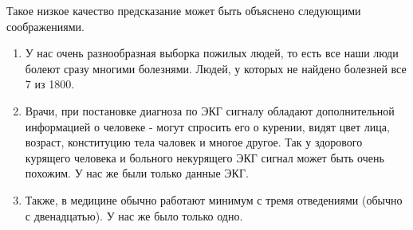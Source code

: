 Такое низкое качество предсказание может быть объяснено следующими соображениями.
\begin{enumerate}
	\item У нас очень разнообразная выборка пожилых людей, то есть все наши люди болеют сразу многими болезнями. Людей, у которых не найдено болезней все 7 из 1800.
	\item Врачи, при постановке диагноза по ЭКГ сигналу обладают дополнительной информацией о человеке - могут спросить его о курении, видят цвет лица, возраст, конституцию тела чаловек и многое другое. Так у здорового курящего человека и больного некурящего ЭКГ сигнал может быть очень похожим. У нас же были только данные ЭКГ.
	\item  Также, в медицине обычно работают минимум с тремя отведениями (обычно с двенадцатью). У нас же было только одно.
\end{enumerate}









